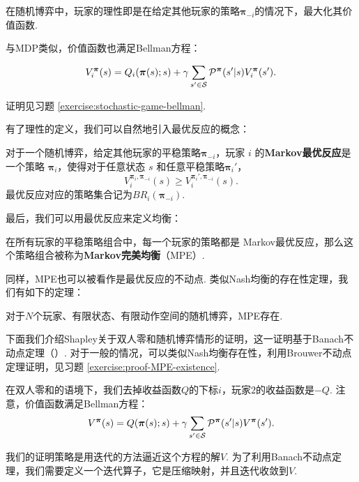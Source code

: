 在随机博弈中，玩家的理性即是在给定其他玩家的策略$\boldsymbol \pi_{-i}$的情况下，最大化其价值函数. 

与MDP类似，价值函数也满足Bellman方程：

\begin{theorem}[Bellman方程]\label{thm:stochastic-game-bellman}
        \[V_i^{\boldsymbol \pi}(s) = Q_i(\boldsymbol \pi(s);s) + \gamma \sum_{s'\in \mathcal S} \mathcal P^{\boldsymbol\pi}(s'|s)V_i^{\boldsymbol \pi}(s').\]
\end{theorem}
证明见习题 \ref{exercise:stochastic-game-bellman}.

有了理性的定义，我们可以自然地引入最优反应的概念：

\begin{definition}[Markov最优反应]
    对于一个随机博弈，给定其他玩家的平稳策略$\boldsymbol \pi_{-i}$，玩家 $i$ 的\textbf{Markov最优反应}是一个策略 $\boldsymbol \pi_i$，使得对于任意状态 $s$ 和任意平稳策略$\boldsymbol \pi_i'$，
    \[V_i^{\boldsymbol \pi_i,\boldsymbol \pi_{-i}}(s)\geq V_i^{\boldsymbol \pi_i',\boldsymbol \pi_{-i}}(s).\]
    最优反应对应的策略集合记为$BR_i(\boldsymbol \pi_{-i})$.
\end{definition}

最后，我们可以用最优反应来定义均衡：

\begin{definition}
    在所有玩家的平稳策略组合中，每一个玩家的策略都是 Markov最优反应，那么这个策略组合被称为\textbf{Markov完美均衡}（MPE）.
\end{definition}

同样，MPE也可以被看作是最优反应的不动点. 类似Nash均衡的存在性定理，我们有如下的定理：

\begin{theorem}[MPE存在性定理]\label{thm:MPE-existence}
对于$N$个玩家、有限状态、有限动作空间的随机博弈，MPE存在.
\end{theorem}

下面我们介绍Shapley关于双人零和随机博弈情形的证明，这一证明基于Banach不动点定理（）. 对于一般的情况，可以类似Nash均衡存在性，利用Brouwer不动点定理证明，见习题 \ref{exercise:proof-MPE-existence}.

在双人零和的语境下，我们去掉收益函数$Q$的下标$i$，玩家$2$的收益函数是$-Q$. 注意，价值函数满足Bellman方程：
    \[V^{\boldsymbol \pi}(s) = Q(\boldsymbol \pi(s);s) + \gamma \sum_{s'\in \mathcal S} \mathcal P^{\boldsymbol\pi}(s'|s)V^{\boldsymbol \pi}(s').\]

我们的证明策略是用迭代的方法逼近这个方程的解$V$. 为了利用Banach不动点定理，我们需要定义一个迭代算子，它是压缩映射，并且迭代收敛到$V$. 

